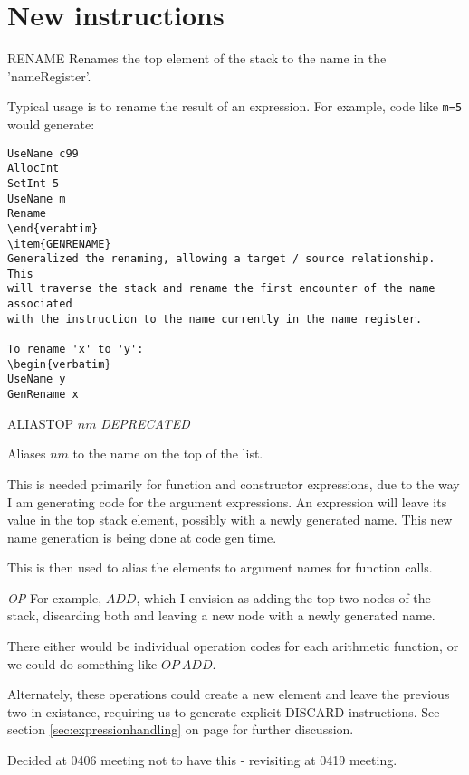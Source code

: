 \documentclass[12pt]{article}
\date{2006-04-06}
\author{Brett Giles}
\begin{document}
\section{New instructions}\label{sec:newinstructions}
\begin{description}
\item{RENAME}
Renames the top element of the stack to the name in the 'nameRegister'.

Typical usage is to rename the result of an expression. For example,
code like \verb|m=5| would generate:
\begin{verbatim}
UseName c99
AllocInt
SetInt 5
UseName m
Rename
\end{verabtim}
\item{GENRENAME}
Generalized the renaming, allowing a target / source relationship. This 
will traverse the stack and rename the first encounter of the name associated
with the instruction to the name currently in the name register.

To rename 'x' to 'y':
\begin{verbatim}
UseName y
GenRename x
\end{verbatim}
\item{ALIASTOP $nm$}
\emph{DEPRECATED}

Aliases $nm$ to the name on the top of the list.

This is needed primarily for function and constructor expressions,
due to the way I am generating code for the argument expressions. An 
expression will leave its value in the top stack element, possibly 
with a newly 
generated name. This new name generation is being done at code gen time.

This is then used to alias the elements to argument names for function calls.

\item{\emph{OP}}
For example, $ADD$, which I envision as adding the top two nodes of the
stack, discarding both and leaving a new node with a newly generated name.

There either would be individual operation codes for each arithmetic 
function, or we could do something like $OP\ ADD$. 

Alternately, these operations could create a new element and leave the 
previous two in existance, requiring us to generate explicit DISCARD 
instructions.  See section 
\ref{sec:expressionhandling} on page \pageref{sec:expressionhandling} for 
further discussion.

Decided at 0406 meeting not to have this - revisiting at 0419 meeting.


\end{description}
\end{document}
